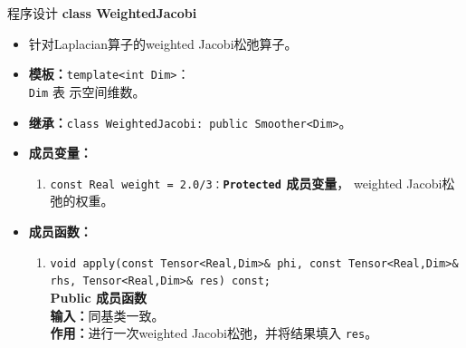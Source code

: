 \documentclass{beamer}
\begin{document}
\begin{frame}{程序设计}
\textbf{class WeightedJacobi}
\begin{itemize}
    \item 针对Laplacian算子的weighted Jacobi松弛算子。
    \item \textbf{模板：}\texttt{template<int Dim>}：\\\texttt{Dim} 表
      示空间维数。
      \item \textbf{继承：}\texttt{class WeightedJacobi: public
          Smoother<Dim>}。
                \item \textbf{成员变量：}
        \begin{enumerate}[(1)]
            \item \texttt{const Real weight =
                2.0/3：}\textbf{\texttt{Protected}  成员变量}，
              weighted Jacobi松弛的权重。
               \end{enumerate}
    \item \textbf{成员函数：}
            \begin{enumerate}[(1)]
                               \item \texttt{void apply(const Tensor<Real,Dim>\& phi, const Tensor<Real,Dim>\&
                     rhs, Tensor<Real,Dim>\& res) const;}\\
                  \textbf{Public 成员函数}\\
                \textbf{输入：}同基类一致。\\
                \textbf{作用：}进行一次weighted Jacobi松弛，并将结果填入
                \texttt{res}。
            \end{enumerate}
          \end{itemize}
        \end{frame}
\end{document}

